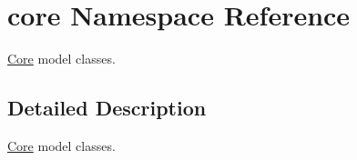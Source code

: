 \hypertarget{namespacecore}{
\section{core Namespace Reference}
\label{d9/d0f/namespacecore}
}


\hyperlink{namespaceCore}{Core} model classes.  




\subsection{Detailed Description}
\hyperlink{namespaceCore}{Core} model classes. 